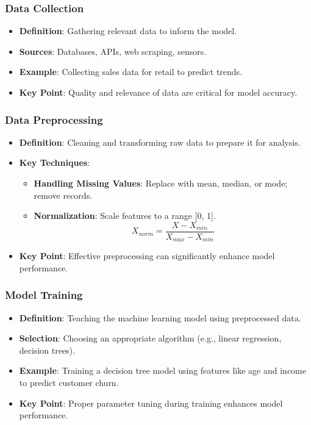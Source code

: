 \documentclass[aspectratio=169]{beamer}
\begin{document}
\begin{frame}[fragile]
    \frametitle{Data Collection}
    \begin{itemize}
        \item \textbf{Definition}: Gathering relevant data to inform the model.
        \item \textbf{Sources}: Databases, APIs, web scraping, sensors.
        \item \textbf{Example}: Collecting sales data for retail to predict trends.
        \item \textbf{Key Point}: Quality and relevance of data are critical for model accuracy.
    \end{itemize}
\end{frame}

\begin{frame}[fragile]
    \frametitle{Data Preprocessing}
    \begin{itemize}
        \item \textbf{Definition}: Cleaning and transforming raw data to prepare it for analysis.
        \item \textbf{Key Techniques}:
        \begin{itemize}
            \item \textbf{Handling Missing Values}: Replace with mean, median, or mode; remove records.
            \item \textbf{Normalization}: Scale features to a range [0, 1].
            \begin{equation}
                X_{norm} = \frac{X - X_{min}}{X_{max} - X_{min}}
            \end{equation}
        \end{itemize}
        \item \textbf{Key Point}: Effective preprocessing can significantly enhance model performance.
    \end{itemize}
\end{frame}

\begin{frame}[fragile]
    \frametitle{Model Training}
    \begin{itemize}
        \item \textbf{Definition}: Teaching the machine learning model using preprocessed data.
        \item \textbf{Selection}: Choosing an appropriate algorithm (e.g., linear regression, decision trees).
        \item \textbf{Example}: Training a decision tree model using features like age and income to predict customer churn.
        \item \textbf{Key Point}: Proper parameter tuning during training enhances model performance.
    \end{itemize}
\end{frame}
\end{document}
